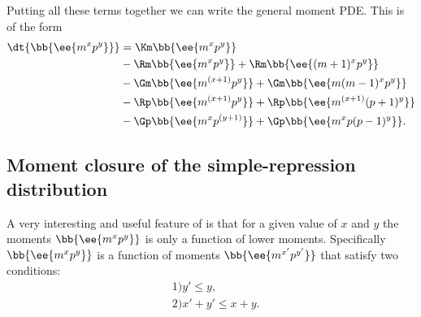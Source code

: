 Putting all these terms together we can write the general moment PDE. This is
of the form
\begin{equation}
  \begin{aligned}
    \dt{\bb{\ee{m^x p^y}}} &=
    \Km \bb{\ee{m^x p^y}}\\
    &- \Rm \bb{\ee{m^x p^y}} + \Rm \bb{\ee{(m+1)^x p^y}}\\
    &- \Gm \bb{\ee{m^{(x + 1)} p^y}} + \Gm \bb{\ee{m (m - 1)^x p^y}}\\
    &- \Rp \bb{\ee{m^{(x + 1)} p^y}} + \Rp \bb{\ee{m^{(x + 1)} (p + 1)^y}}\\
    &- \Gp \bb{\ee{m^x p^{(y + 1)}}} + \Gp \bb{\ee{m^x p (p - 1)^y}}.
  \end{aligned}
  \label{seq_mom_pde}
\end{equation}

\subsection{Moment closure of the simple-repression distribution}

A very interesting and useful feature of  is that for a given
value of $x$ and $y$ the moments $\bb{\ee{m^x p^y}}$ is only a function of lower
moments. Specifically $\bb{\ee{m^x p^y}}$ is a function of moments
$\bb{\ee{m^{x'} p^{y'}}}$ that satisfy two conditions:
\begin{equation}
  \begin{aligned}
    &1) y' \leq y,\\
  &2) x' + y' \leq x + y.
  \end{aligned}
  \label{seq_mom_conditions}
\end{equation}

